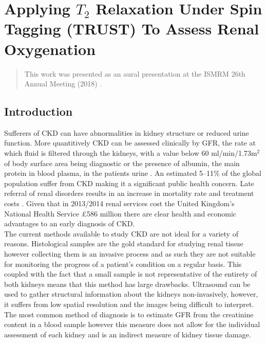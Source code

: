 \chapter{Applying $T_2$ Relaxation Under Spin Tagging (TRUST) To Assess Renal Oxygenation}
\label{chap:TRUST}

\begin{abstract}
	This work was presented as an aural presentation at the \ac{ISMRM} 26th Annual Meeting (2018) \cite{daniel_applying_2018}.\\
	
	\lipsum[1]
\end{abstract}
\newpage

\section{Introduction}
Sufferers of \ac{CKD} can have abnormalities in kidney structure or reduced urine function. More quantitively \ac{CKD} can be assessed clinically by \ac{GFR}, the rate at which fluid is filtered through the kidneys, with a value below 60 ml/min/1.73m$^2$ of body surface area being diagnostic or the presence of albumin, the main protein in blood plasma, in the patients urine \cite{stevens_assessing_2006, farrugia_albumin_2010, pruijm_blood_2017}. An estimated 5–11\% of the global population suffer from \ac{CKD} \cite{coresh_prevalence_2003, de_lusignan_identifying_2005, drey_population-based_2003, amato_prevalence_2005, chadban_prevalence_2003} making it a significant public health concern. Late referral of renal disorders results in an increase in mortality rate and treatment costs \cite{jungers_late_1993, sesso_late_1996, klebe_cost_2007}. Given that in 2013/2014 renal services cost the United Kingdom's National Health Service \pounds 586 million \cite{precious_nhs_2015} there are clear health and economic advantages to an early diagnosis of \ac{CKD}.\\

The current methods available to study \ac{CKD} are not ideal for a variety of reasons. Histological samples are the gold standard for studying renal tissue however collecting them is an invasive process and as such they are not suitable for monitoring the progress of a patient's condition on a regular basis. This coupled with the fact that a small sample is not representative of the entirety of both kidneys means that this method  has large drawbacks. Ultrasound can be used to gather structural information about the kidneys non-invasively, however, it suffers from low spatial resolution and the images being difficult to interpret. The most common method of diagnosis is to estimate \ac{GFR} from the creatinine content in a blood sample however this measure does not allow for the individual assessment of each kidney and is an indirect measure of kidney tissue damage.\\

